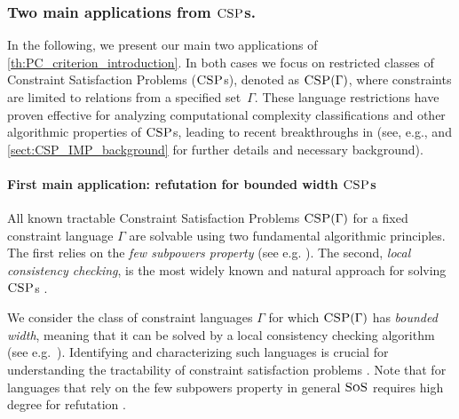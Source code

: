 \documentclass[11pt]{article}
\newcommand{\sos}{\text{\sc{SoS}}}
\newcommand{\CSP}{\textsc{CSP}}
\newcommand{\IMP}{\textsc{IMP}}
\newcommand{\PC}{\textsc{PC}}
\newcommand{\Nsatz}{\textsc{Nsatz}}
\newcommand{\1}{\textbf{1}}
\begin{document}
\subsubsection*{Two main applications from $\CSP$s.}
In the following, we present our main two applications of \cref{th:PC_criterion_introduction}.
In both cases we focus on restricted classes of Constraint Satisfaction Problems (\(\CSP\)s), denoted as \(\CSP(\Gamma)\), where constraints are limited to relations from a specified set~\(\Gamma\). These language restrictions have proven effective for analyzing computational complexity classifications and other algorithmic properties of $\CSP$s, leading to recent breakthroughs in \cite{Bulatov17,Zhuk17,Zhuk20} (see, e.g., \cite{barto_et_al:DFU:2017:6959,2017dfu7,Chen09} and \cref{sect:CSP_IMP_background} for further details and necessary background).

\paragraph{First main application: refutation for bounded width $\CSP$s}
%
All known tractable Constraint Satisfaction Problems $\CSP(\Gamma)$ for a fixed constraint language $\Gamma$  are solvable using two fundamental algorithmic principles. The first relies on the \emph{few subpowers property} (see e.g. \cite{barto_et_al:DFU:2017:6959}). The second, \emph{local consistency checking}, is the most widely known and natural approach for solving $\CSP$s \cite{BartoK14,barto_et_al:DFU:2017:6959,Bulatov17}.


We consider the class of constraint languages $\Gamma$ for which $\CSP(\Gamma)$ has \emph{bounded width}, meaning that it can be solved by a local consistency checking algorithm (see e.g.~\cite{BartoK14,barto_et_al:DFU:2017:6959}). Identifying and characterizing such languages is crucial for understanding the tractability of constraint satisfaction problems \cite{BartoK14,barto_et_al:DFU:2017:6959}. Note that for languages that rely on the {few subpowers property} in general $\sos$ requires high degree for refutation \cite{barto_et_al:DFU:2017:6959,BartoK14, GRIGORIEV2001613}.
\end{document}
